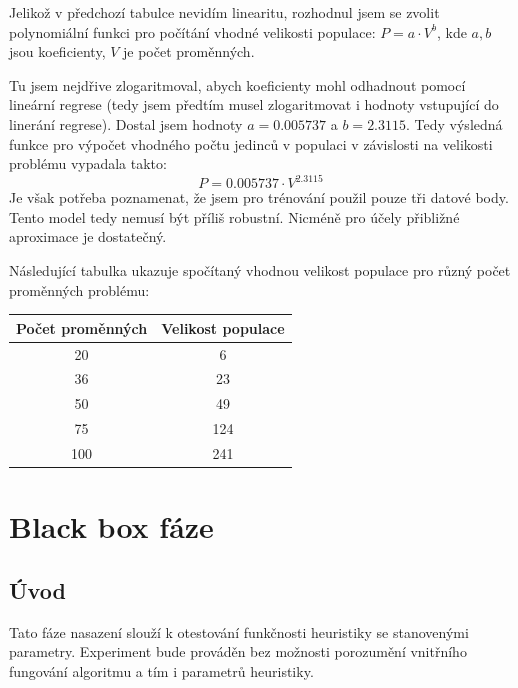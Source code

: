 \documentclass[12pt]{article}
\begin{document}
Jelikož v předchozí tabulce nevidím linearitu, rozhodnul jsem se zvolit polynomiální funkci pro počítání vhodné velikosti populace: $P=a \cdot V^b$, kde $a, b$ jsou koeficienty, $V$ je počet proměnných.

Tu jsem nejdřive zlogaritmoval, abych koeficienty mohl odhadnout pomocí lineární regrese (tedy jsem předtím musel zlogaritmovat i hodnoty vstupující do linerání regrese). Dostal jsem hodnoty $a=0.005737$ a $b=2.3115$. Tedy výsledná funkce pro výpočet vhodného počtu jedinců v populaci v závislosti na velikosti problému vypadala takto: $$P = 0.005737 \cdot V^{2.3115}$$ Je však potřeba poznamenat, že jsem pro trénování použil pouze tři datové body. Tento model tedy nemusí být příliš robustní. Nicméně pro účely přibližné aproximace je dostatečný.

Následující tabulka ukazuje spočítaný vhodnou velikost populace pro různý počet proměnných problému:

\begin{table}[h!]
\centering
\begin{tabular}{@{}cc@{}}
\toprule
\textbf{Počet proměnných} & \textbf{Velikost populace} \\ \midrule
20                         & 6                          \\
36                         & 23                          \\
50                         & 49                          \\
75                         & 124                         \\
100                        & 241                         \\ \bottomrule
\end{tabular}
\end{table}



\newpage
\section{Black box fáze}

\subsection{Úvod}

Tato fáze nasazení slouží k otestování funkčnosti heuristiky se stanovenými parametry. Experiment bude prováděn bez možnosti porozumění vnitřního fungování algoritmu a tím i parametrů heuristiky. 
\end{document}
